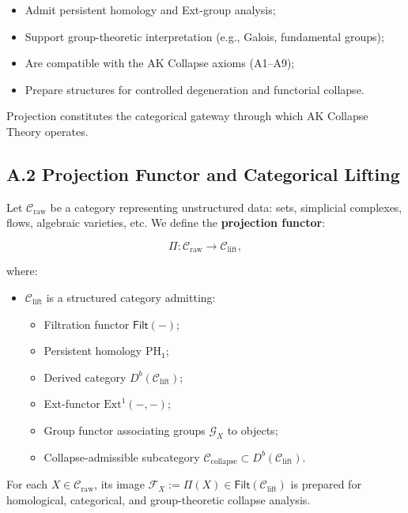 \documentclass[11pt]{article}
\begin{document}
\begin{itemize}
    \item Admit persistent homology and Ext-group analysis;
    \item Support group-theoretic interpretation (e.g., Galois, fundamental groups);
    \item Are compatible with the AK Collapse axioms (A1–A9);
    \item Prepare structures for controlled degeneration and functorial collapse.
\end{itemize}

Projection constitutes the categorical gateway through which AK Collapse Theory operates.

\subsection*{A.2 Projection Functor and Categorical Lifting}

Let \( \mathcal{C}_{\mathrm{raw}} \) be a category representing unstructured data: sets, simplicial complexes, flows, algebraic varieties, etc. We define the \textbf{projection functor}:

\[
\Pi : \mathcal{C}_{\mathrm{raw}} \longrightarrow \mathcal{C}_{\mathrm{lift}},
\]

where:

\begin{itemize}
    \item \( \mathcal{C}_{\mathrm{lift}} \) is a structured category admitting:
    \begin{itemize}
        \item Filtration functor \( \mathsf{Filt}(-) \);
        \item Persistent homology \( \mathrm{PH}_1 \);
        \item Derived category \( D^b(\mathcal{C}_{\mathrm{lift}}) \);
        \item Ext-functor \( \mathrm{Ext}^1(-, -) \);
        \item Group functor associating groups \( \mathcal{G}_X \) to objects;
        \item Collapse-admissible subcategory \( \mathcal{C}_{\mathrm{collapse}} \subset D^b(\mathcal{C}_{\mathrm{lift}}) \).
    \end{itemize}
\end{itemize}

For each \( X \in \mathcal{C}_{\mathrm{raw}} \), its image \( \mathcal{F}_X := \Pi(X) \in \mathsf{Filt}(\mathcal{C}_{\mathrm{lift}}) \) is prepared for homological, categorical, and group-theoretic collapse analysis.
\end{document}
